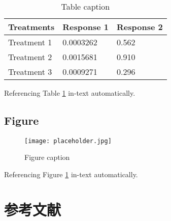 \documentclass[11pt,twoside]{book} %
\begin{document}
\begin{table}[h]
    \centering
    \begin{tabular}{l l l}
        \toprule
        \textbf{Treatments} & \textbf{Response 1} & \textbf{Response 2} \\
        \midrule
        Treatment 1         & 0.0003262           & 0.562               \\
        Treatment 2         & 0.0015681           & 0.910               \\
        Treatment 3         & 0.0009271           & 0.296               \\
        \bottomrule
    \end{tabular}
    \caption{Table caption}
    \label{tab:example} %
\end{table}

Referencing Table \ref{tab:example} in-text automatically.


\section{Figure}

\begin{figure}[h]
    \centering\texttt{[image: placeholder.jpg]}
    \caption{Figure caption}
    \label{fig:placeholder} %
\end{figure}

Referencing Figure \ref{fig:placeholder} in-text automatically.

\renewcommand{\bibname}{参考文献}
\chapter*{参考文献}
\printbibliography[heading=bibempty]

\end{document}
